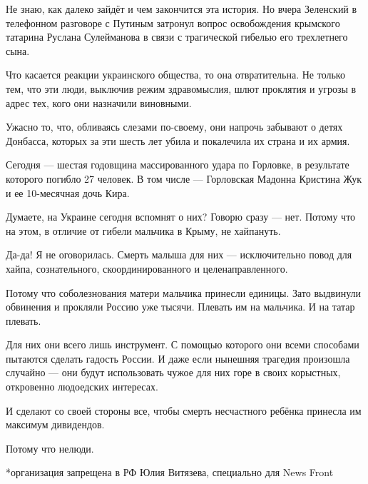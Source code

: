 Не знаю, как далеко зайдёт и чем закончится эта история.  Но вчера Зеленский в
телефонном разговоре с Путиным затронул вопрос освобождения крымского татарина
Руслана Сулейманова в связи с трагической гибелью его трехлетнего сына.

Что касается реакции украинского общества, то она отвратительна. Не только тем,
что эти люди, выключив режим здравомыслия, шлют проклятия и угрозы в адрес тех,
кого они назначили виновными.

Ужасно то, что, обливаясь слезами по-своему, они напрочь забывают о детях
Донбасса, которых за эти шесть лет убила и покалечила их страна и их армия.

Сегодня --- шестая годовщина массированного удара по Горловке, в результате
которого погибло 27 человек.  В том числе --- Горловская Мадонна Кристина Жук и
ее 10-месячная дочь Кира.

Думаете, на Украине сегодня вспомнят о них?  Говорю сразу --- нет.  Потому что на
этом, в отличие от гибели мальчика в Крыму, не хайпануть.

Да-да! Я не оговорилась.  Смерть малыша для них --- исключительно повод для
хайпа, сознательного, скоординированного и целенаправленного.

Потому что соболезнования матери мальчика принесли единицы. Зато выдвинули
обвинения и прокляли Россию уже тысячи.  Плевать им на мальчика.  И на татар
плевать.

Для них они всего лишь инструмент.  С помощью которого они всеми способами
пытаются сделать гадость России.  И даже если нынешняя трагедия произошла
случайно --- они будут использовать чужое для них горе в своих корыстных,
откровенно людоедских интересах.

И сделают со своей стороны все, чтобы смерть несчастного ребёнка принесла им
максимум дивидендов.

Потому что нелюди.

*организация запрещена в РФ Юлия Витязева, специально для News Front
  
